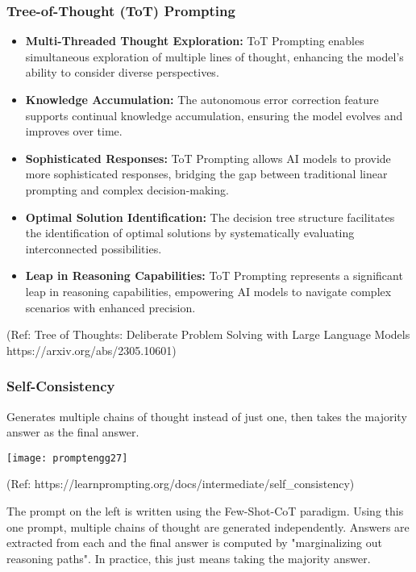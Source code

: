 \begin{frame}[fragile]\frametitle{Tree-of-Thought (ToT) Prompting}

\begin{itemize}
  \item \textbf{Multi-Threaded Thought Exploration:} ToT Prompting enables simultaneous exploration of multiple lines of thought, enhancing the model's ability to consider diverse perspectives.
  
  \item \textbf{Knowledge Accumulation:} The autonomous error correction feature supports continual knowledge accumulation, ensuring the model evolves and improves over time.
  
  \item \textbf{Sophisticated Responses:} ToT Prompting allows AI models to provide more sophisticated responses, bridging the gap between traditional linear prompting and complex decision-making.
  
  \item \textbf{Optimal Solution Identification:} The decision tree structure facilitates the identification of optimal solutions by systematically evaluating interconnected possibilities.
  
  \item \textbf{Leap in Reasoning Capabilities:} ToT Prompting represents a significant leap in reasoning capabilities, empowering AI models to navigate complex scenarios with enhanced precision.
  
\end{itemize}


{\tiny (Ref: Tree of Thoughts: Deliberate Problem Solving with Large Language Models https://arxiv.org/abs/2305.10601)}



\end{frame}



\begin{frame}[fragile]\frametitle{Self-Consistency}

Generates multiple chains of thought instead of just one, then takes the majority answer as the final answer.

\begin{center}
\texttt{[image: promptengg27]}

{\tiny (Ref: https://learnprompting.org/docs/intermediate/self\_consistency)}

\end{center}		

The prompt on the left is written using the Few-Shot-CoT paradigm. Using this one prompt, multiple chains of thought are generated independently. Answers are extracted from each and the final answer is computed by "marginalizing out reasoning paths". In practice, this just means taking the majority answer.

\end{frame}

